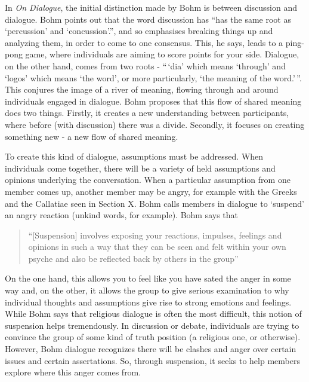 \documentclass[]{article}
\begin{document}
In \emph{On Dialogue}, the initial distinction made by Bohm is between
discussion and dialogue. Bohm points out that the word discussion has
``has the same root as `percussion' and
`concussion'.''\autocite[pg 7]{BohmDialogue2004}, and so emphasises
breaking things up and analyzing them, in order to come to one
consensus. This, he says, leads to a ping-pong game, where individuals
are aiming to score points for your
side\autocite[pg 7]{BohmDialogue2004}. Dialogue, on the other hand,
comes from two roots - ``\,`dia' which means `through' and `logos' which
means `the word', or more particularly, `the meaning of the
word.'\,''\autocite{BohmDialogueProposal}. This conjures the image of a
river of meaning, flowing through and around individuals engaged in
dialogue. Bohm proposes that this flow of shared meaning does two
things. Firstly, it creates a new understanding between participants,
where before (with discussion) there was a divide. Secondly, it focuses
on creating something new - a new flow of shared meaning.

To create this kind of dialogue, assumptions must be addressed. When
individuals come together, there will be a variety of held assumptions
and opinions underlying the conversation. When a particular assumption
from one member comes up, another member may be angry, for example with
the Greeks and the Callatiae seen in Section X. Bohm calls members in
dialogue to `suspend' an angry reaction (unkind words, for example).
Bohm says that

\begin{quote}
``{[}Suspension{]} involves exposing your reactions, impulses, feelings
and opinions in such a way that they can be seen and felt within your
own psyche and also be reflected back by others in the
group''\autocite{BohmDialogueProposal}
\end{quote}

On the one hand, this allows you to feel like you have sated the anger
in some way and, on the other, it allows the group to give serious
examination to why individual thoughts and assumptions give rise to
strong emotions and feelings\autocite{BohmDialogueProposal}. While Bohm
says that religious dialogue is often the most difficult, this notion of
suspension helps tremendously. In discussion or debate, individuals are
trying to convince the group of some kind of truth position (a religious
one, or otherwise). However, Bohm dialogue recognizes there will be
clashes and anger over certain issues and certain assertations. So,
through suspension, it seeks to help members explore where this anger
comes from.
\end{document}
